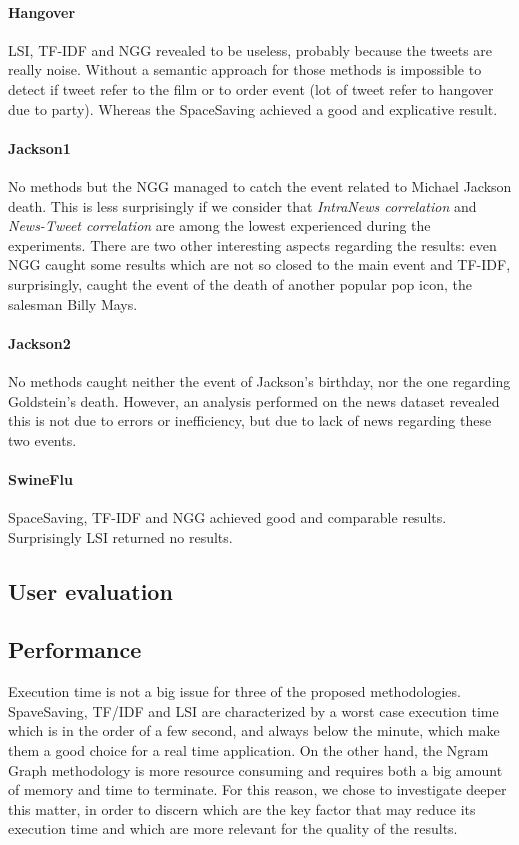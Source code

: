 \paragraph*{Hangover}
LSI, TF-IDF and NGG revealed to be useless, probably because the tweets are really noise.
Without a semantic approach for those methods is impossible to detect if tweet refer to the film or to order event (lot of tweet refer to hangover due to party).
Whereas the SpaceSaving achieved a good and explicative result.

\paragraph*{Jackson1}
No methods but the NGG managed to catch the event related to
Michael Jackson death. This is less surprisingly if we consider that
\emph{IntraNews correlation} and \emph{News-Tweet correlation} are among the
lowest experienced during the experiments.
There are two other interesting aspects regarding the
results: even NGG caught some results which are not so closed to the main event
and TF-IDF, surprisingly, caught the event of the death of another popular pop
icon, the salesman Billy Mays.

\paragraph*{Jackson2}
No methods caught neither the event of Jackson's birthday, nor the one regarding
Goldstein's death. However, an analysis performed on the news dataset revealed
this is not due to errors or inefficiency, but due to lack of news regarding
these two events.

\paragraph*{SwineFlu}
SpaceSaving, TF-IDF and NGG achieved good and comparable results. Surprisingly LSI returned
no results.

\subsection*{User evaluation}


\subsection*{Performance}
Execution time is not a big issue for three of the proposed methodologies.
SpaveSaving, TF/IDF and LSI are characterized by a worst case execution time
which is in the order of a few second, and always below the minute, which make
them a good choice for a real time application. On the other hand, the Ngram
Graph methodology is more resource consuming and requires both a big amount of
memory and time to terminate. For this reason, we chose to investigate deeper
this matter, in order to discern which are the key factor that may reduce its
execution time and which are more relevant for the quality of the results. 
 
